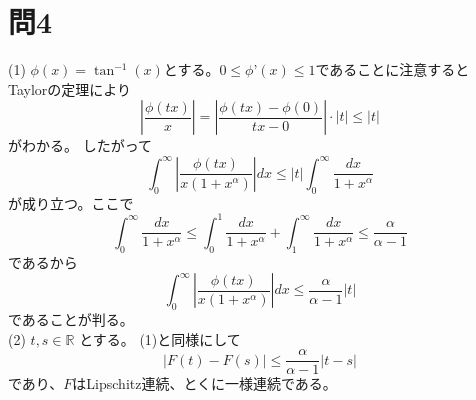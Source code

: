 ﻿\documentclass{jsarticle}
\begin{document}
\section*{問4}
\noindent
(1) $\phi(x) = \tan^{-1} (x)$とする。$0 \leq \phi’(x) \leq 1$であることに注意すると
Taylorの定理により
$$
\left| \frac{\phi(tx)}{x} \right| =\left| \frac{\phi(tx) - \phi(0)}{tx - 0} \right| \cdot |t| \leq |t|
$$
がわかる。
したがって
$$
\int_{0}^{\infty} \left| \frac{\phi(tx)}{x(1 + x^{\alpha})} \right| dx
\leq |t| \int_{0}^{\infty} \frac{dx}{1 + x^{\alpha}}
$$
が成り立つ。ここで
$$
\int_{0}^{\infty} \frac{dx}{1 + x^{\alpha}}
\leq  \int_{0}^{1} \frac{dx}{1 + x^{\alpha}} +  \int_{1}^{\infty} \frac{dx}{1 + x^{\alpha}}
\leq \frac{\alpha}{\alpha - 1}
$$
であるから
$$
\int_{0}^{\infty} \left| \frac{\phi(tx)}{x(1 + x^{\alpha})} \right| dx
\leq \frac{\alpha}{\alpha - 1} |t|
$$
であることが判る。\\

\noindent
(2) $t, s \in \mathbb{R}$	とする。 (1)と同様にして
$$
|F(t) - F(s)|
\leq \frac{\alpha}{\alpha - 1} |t - s|
$$
であり、$F$はLipschitz連続、とくに一様連続である。
\end{document}
